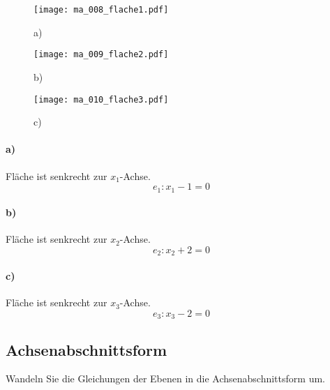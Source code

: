 \documentclass{ajc}
\numberwithin{equation}{subsection}
\begin{document}
	\begin{figure}[ht]
		\centering
		\begin{minipage}[b]{0.2\textwidth}
			\texttt{[image: ma\_008\_flache1.pdf]}
			\label{fig:008_flache1}
			\begin{center}
				a)
			\end{center}
		\end{minipage}
		\hfill
		\begin{minipage}[b]{0.2\textwidth}
			\texttt{[image: ma\_009\_flache2.pdf]}
			\label{fig:009_flache2}
			\begin{center}
				b)
			\end{center}
		\end{minipage}
		\hfill
		\begin{minipage}[b]{0.2\textwidth}
			\texttt{[image: ma\_010\_flache3.pdf]}
			\label{fig:010_flache3}
			\begin{center}
				c)
			\end{center}
		\end{minipage}
	\end{figure}
	
	\paragraph{a)} Fläche ist senkrecht zur $x_1$-Achse.
	\begin{equation}
		e_1: x_1 - 1 = 0
	\end{equation}
	
	\paragraph{b)} Fläche ist senkrecht zur $x_2$-Achse.
	\begin{equation}
		e_2: x_2 + 2 = 0
	\end{equation}
	
	\paragraph{c)} Fläche ist senkrecht zur $x_3$-Achse.
	\begin{equation}
		e_3: x_3 - 2 = 0
	\end{equation}
	
	\subsection{Achsenabschnittsform}
	Wandeln Sie die Gleichungen der Ebenen in die Achsenabschnittsform um.
	
\end{document}
